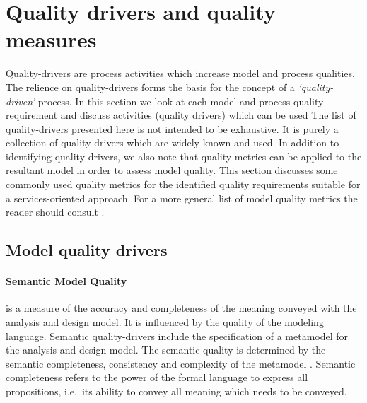 \section{Quality drivers and quality measures}
\label{sec:qualityDriversAndMetrics}

Quality-drivers are process activities which increase model and process qualities. The relience on quality-drivers \cite{petersen_software_1989} forms the basis for the concept of a \emph{`quality-driven'} process. In this section we look at each model and process quality requirement and discuss activities (quality drivers) which can be used
The list of quality-drivers presented here is not intended to be exhaustive. It is purely a collection of quality-drivers which are widely known and used. In addition to identifying quality-drivers, we also note that quality metrics can be applied to the resultant model in order to assess model quality. This section discusses some commonly used quality metrics for the identified quality requirements suitable for a services-oriented approach. For a more general list of model quality metrics the reader should consult \cite{mohagheghi_existing_2009}.

\subsection{Model quality drivers}

\paragraph{Semantic Model Quality} is a measure of the accuracy and completeness of the meaning conveyed with the analysis and design model. It is influenced by the quality of the modeling language. Semantic quality-drivers include the specification of a metamodel for the analysis and design model. The semantic quality is determined by the semantic completeness, consistency and complexity of the metamodel \cite{buder_effects_2010}. Semantic completeness refers to the power of the formal language to express all propositions, i.e.\ its ability to convey all meaning which needs to be conveyed. 

